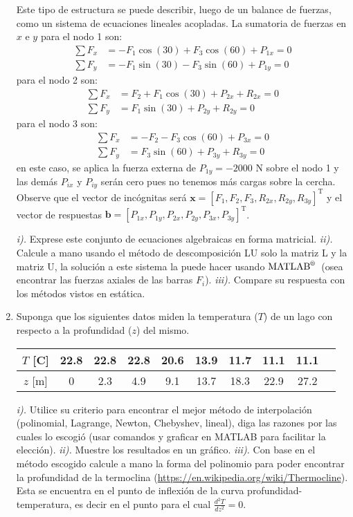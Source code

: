 \documentclass[letterpaper,12pt]{exam}
\newcommand{\matlab}{$\text{MATLAB}^{\text{\textregistered}}$~}
\begin{document}
\begin{enumerate}
 Este tipo de estructura se puede describir, luego de un balance de fuerzas, como un sistema de ecuaciones lineales acopladas. La sumatoria de fuerzas en $x$ e $y$ para el nodo 1 son:
 \begin{align}
  \sum F_x & = −F_1 \cos(30) + F_3 \cos(60) + P_{1x}  = 0 \\
  \sum F_y & = −F_1 \sin(30) − F_3 \sin(60) + P_{1y} = 0
 \end{align}
 para el nodo 2 son:
 \begin{align}
  \sum F_x & = F_2 + F_1 \cos(30) + P_{2x} + R_{2x} = 0 \\
  \sum F_y & = F_1 \sin(30) + P_{2y} + R_{2y} = 0
 \end{align}
 para el nodo 3 son:
 \begin{align}
  \sum F_x & = - F_2 - F_3 \cos(60) + P_{3x}  = 0 \\
  \sum F_y & = F_3 \sin(60) + P_{3y} + R_{3y} = 0
 \end{align}
 en este caso, se aplica la fuerza externa de $P_{1y}=-2000$ N sobre el nodo 1 y las demás $P_{ix}$ y $P_{iy}$ serán cero pues no tenemos más cargas sobre la cercha. Observe que el vector de incógnitas será $\mathbf{x}=[ F_1, F_2, F_3, R_{2x}, R_{2y}, R_{3y}]^{\text{T}}$ y el vector de respuestas $\mathbf{b}=[P_{1x},P_{1y},P_{2x},P_{2y},P_{3x},P_{3y}]^{\text{T}}$.
 
 \emph{i).} Exprese este conjunto de ecuaciones algebraicas en forma matricial. \emph{ii).} Calcule a mano usando el método de descomposición LU solo la matriz L y la matriz U, la solución a este sistema la puede hacer usando \matlab (osea encontrar las fuerzas axiales de las barras $F_{i}$). \emph{iii).} Compare su respuesta con los métodos vistos en estática.

 \item Suponga que los siguientes datos miden la temperatura ($T$) de un lago con respecto a la profundidad ($z$) del mismo.
 
 \begin{table}[!hb]
  \centering
  \begin{tabular}{c|ccccccccc}
   $T$ [C] & 22.8 & 22.8 & 22.8 & 20.6 & 13.9 & 11.7 & 11.1 & 11.1 \\
   \hline
   $z$ [m] & 0    & 2.3  & 4.9  & 9.1  & 13.7 & 18.3 & 22.9 & 27.2
  \end{tabular}
 \end{table}
 
 \emph{i).} Utilice su criterio para encontrar el mejor método de interpolación (polinomial, Lagrange, Newton, Chebyshev, lineal), diga las razones por las cuales lo escogió (usar comandos y graficar en MATLAB para facilitar la elección). \emph{ii).} Muestre los resultados en un gráfico. \emph{iii).} Con base en el método escogido calcule a mano la forma del polinomio para poder encontrar la profundidad de la termoclina (\url{https://en.wikipedia.org/wiki/Thermocline}). Esta se encuentra en el punto de inflexión de la curva profundidad-temperatura, es decir en el punto para el cual $\frac{d^2T}{dz^2}=0$.

\end{enumerate}
\end{document}
